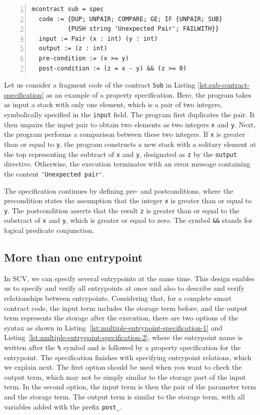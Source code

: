 \documentclass[a4paper,USenglish,cleveref, autoref,anonymous]{lipics-v2021}
\begin{document}
\begin{lstlisting}[float,captionpos=b,caption={Specification of Sub contract},label={lst:sub-contract-specification},numbers=left]
mcontract sub = spec
  code := {DUP; UNPAIR; COMPARE; GE; IF {UNPAIR; SUB} 
          {PUSH string 'Unexpected Pair'; FAILWITH}}
  input := Pair (x : int) (y : int)
  output := (z : int)
  pre-condition := (x >= y)
  post-condition := (z = x - y) && (z >= 0)
\end{lstlisting}

Let us consider a fragment code of the contract \texttt{Sub}  in Listing
\ref{lst:sub-contract-specification} as an example of a property
specification.  Here, the program takes as input a stack with only one
element, which is a pair of two integers, symbolically specified in
the \lstinline|input| field. The program first duplicates the pair. It then unpairs the input pair to obtain two elements as two integers \lstinline/x/ and \lstinline/y/.
Next, the program performs a comparison between
these two integers. If \lstinline/x/ is greater than or equal to
\lstinline/y/, the program constructs a new stack with a solitary
element at the top representing the subtract of  \lstinline/x/ and
\lstinline/y/, designated as \lstinline/z/ by the \lstinline|output| directive. Otherwise, the execution
terminates with an error message containing the content
\lstinline|'Unexpected pair'|.

The specification continues by defining
pre- and postconditions, where the precondition states the assumption
that the integer \lstinline/x/ is greater than or equal to  \lstinline/y/. The postcondition asserts that the result
\lstinline/z/ is greater than or equal to the substract of \lstinline/x/ and \lstinline/y/, which is greater or equal to zero. The symbol \lstinline/&&/ stands for logical predicate conjunction.

\subsection{More than one entrypoint}
\label{sec:more-than-one}
In SCV, we can specify several entrypoints at the same
time. This design enables us to specify and verify all entrypoints
at once and also to describe and verify relationships between
entrypoints.  Considering that, for a complete smart contract code, the input term includes the storage term before, and the output term represents the storage after the execution, there are two options of the syntax as shown in Listing~\ref {lst:multiple-entrypoint-specification-1} and Listing~\ref {lst:multiple-entrypoint-specification-2},
where the entrypoint name is written after the \lstinline/%/ symbol
and is followed by a property specification for the entrypoint. The
specification finishes with specifying entrypoint relations,
which we explain next.  The first option should be used when you want to check the output term, which may not be simply similar to the storage part of the input term. In the second option, the input term is then the pair of the parameter term and the storage term. The output term is similar to the storage term, with all variables added with the prefix \lstinline/post_/.
\end{document}

